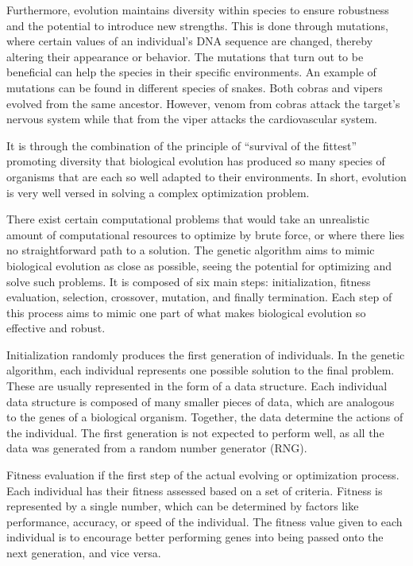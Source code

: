 \documentclass[12pt]{article}
\begin{document}
Furthermore, evolution maintains diversity within species to ensure robustness and the potential to introduce new strengths. This is done through mutations, where certain values of an individual's DNA sequence are changed, thereby altering their appearance or behavior. The mutations that turn out to be beneficial can help the species in their specific environments. An example of mutations can be found in different species of snakes. Both cobras and vipers evolved from the same ancestor. However, venom from cobras attack the target's nervous system while that from the viper attacks the cardiovascular system.

It is through the combination of the principle of ``survival of the fittest'' promoting diversity that biological evolution has produced so many species of organisms that are each so well adapted to their environments. In short, evolution is very well versed in solving a complex optimization problem.

There exist certain computational problems that would take an unrealistic amount of computational resources to optimize by brute force, or where there lies no straightforward path to a solution. The genetic algorithm aims to mimic biological evolution as close as possible, seeing the potential for optimizing and solve such problems. It is composed of six main steps: initialization, fitness evaluation, selection, crossover, mutation, and finally termination. Each step of this process aims to mimic one part of what makes biological evolution so effective and robust.

Initialization randomly produces the first generation of individuals. In the genetic algorithm, each individual represents one possible solution to the final problem. These are usually represented in the form of a data structure. Each individual data structure is composed of many smaller pieces of data, which are analogous to the genes of a biological organism. Together, the data determine the actions of the individual. The first generation is not expected to perform well, as all the data was generated from a random number generator (RNG).

Fitness evaluation if the first step of the actual evolving or optimization process. Each individual has their fitness assessed based on a set of criteria. Fitness is represented by a single number, which can be determined by factors like performance, accuracy, or speed of the individual. The fitness value given to each individual is to encourage better performing genes into being passed onto the next generation, and vice versa.
\end{document}
